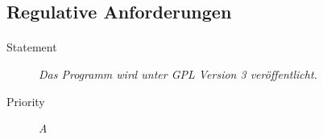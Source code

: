 \subsection{Regulative Anforderungen}

\paragraph{}
\begin{description}
\item[Statement] \textit{Das Programm wird unter GPL Version 3 veröffentlicht.}
\item[Priority] \textit{A}
\end{description}

